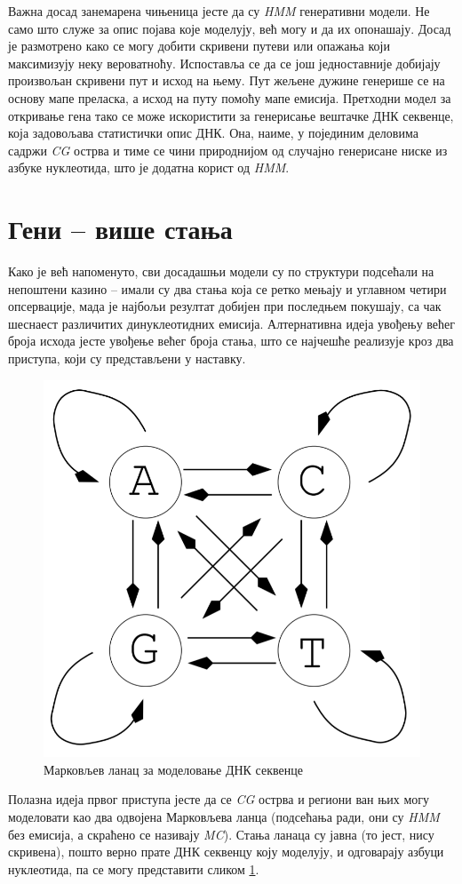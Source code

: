\documentclass[12pt,oneside]{memoir}
\begin{document}
\begin{CJK}{UTF8}{ipxm}
Важна досад занемарена чињеница јесте да су \textit{HMM} генеративни модели. Не само што служе за опис појава које моделују, већ могу и да их опонашају. Досад је размотрено како се могу добити скривени путеви или опажања који максимизују неку вероватноћу. Испоставља се да се још једноставније добијају произвољан скривени пут и исход на њему. Пут жељене дужине генерише се на основу мапе преласка, а исход на путу помоћу мапе емисија. Претходни модел за откривање гена тако се може искористити за генерисање вештачке ДНК секвенце, која задовољава статистички опис ДНК. Она, наиме, у појединим деловима садржи \textit{CG} острва и тиме се чини природнијом од случајно генерисане ниске из азбуке нуклеотида, што је додатна корист од \textit{HMM}.

\section{Гени -- више стања}
Како је већ напоменуто, сви досадашњи модели су по структури подсећали на непоштени казино -- имали су два стања која се ретко мењају и углавном четири опсервације, мада је најбољи резултат добијен при последњем покушају, са чак шеснаест различитих динуклеотидних емисија. Алтернативна идеја увођењу већег броја исхода јесте увођење већег броја стања, што се најчешће реализује кроз два приступа, који су представљени у наставку.

\begin{figure}[H]
  \centering
  \includegraphics[width=.5\textwidth]{cg_lanac.png}
  \caption{Марковљев ланац за моделовање ДНК секвенце \cite{huson2020}}
  \label{fig:cg_lanac}
\end{figure}

Полазна идеја првог приступа \cite{holmes2012, huson2020, kellis2021, shamir2009} јесте да се \textit{CG} острва и региони ван њих могу моделовати као два одвојена Марковљева ланца (подсећања ради, они су \textit{HMM} без емисија, а скраћено се називају \textit{MC}). Стања ланаца су јавна (то јест, нису скривена), пошто верно прате ДНК секвенцу коју моделују, и одговарају азбуци нуклеотида, па се могу представити сликом \ref{fig:cg_lanac}.


\end{CJK}
\end{document}
